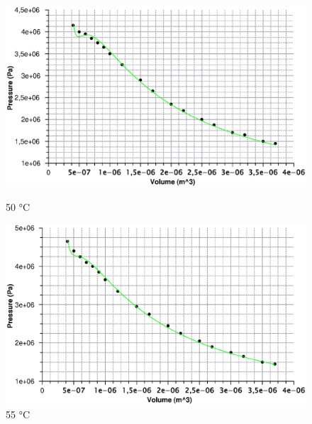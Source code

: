 \documentclass{scrartcl}
\begin{document}
\begin{figure}[!tbp]
  \centering
  \begin{minipage}[b]{0.4\textwidth}
    \includegraphics[width=\textwidth]{vdw50.eps}
    \caption{50 °C}
  \end{minipage}
  \hfill
  \begin{minipage}[b]{0.4\textwidth}
    \includegraphics[width=\textwidth]{vdw55.eps}
    \caption{55 °C}
  \end{minipage}
\end{figure}
\end{document}
